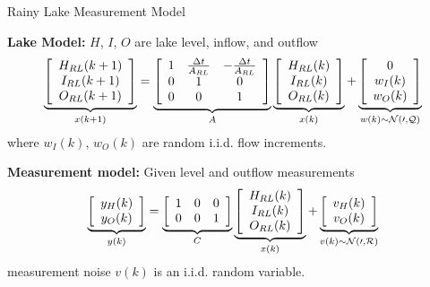 \documentclass[compress,english]{beamer}
\begin{document}
\begin{frame}{Rainy Lake Measurement Model}

{\bf Lake Model:} $H$, $I$, $O$ are lake level, inflow, and outflow
$$\underbrace{\left[\begin{array}{c} H_{RL}(k+1) \\ I_{RL}(k+1) \\ O_{RL}(k+1) \end{array}\right]}_{x(k+1)} = \underbrace{\left[ \begin{array}{ccc} 1 & \frac{\Delta t}{A_{RL}} & -\frac{\Delta t}{A_{RL}} \\0 & 1 & 0\\0 & 0 & 1\end{array}\right]}_{A} \underbrace{\left[\begin{array}{c} H_{RL}(k) \\ I_{RL}(k) \\ O_{RL}(k) \end{array}\right]}_{x(k)} + \underbrace{\left[ \begin{array}{c} 0 \\ w_{I}(k) \\ w_{O}(k)\end{array}\right]}_{w(k)\sim\cal{N}(0,Q)}$$
where $w_I(k)$, $w_O(k)$ are random i.i.d. flow increments.

{\bf Measurement model:} Given level and outflow measurements
$$\underbrace{\left[\begin{array}{c} y_H(k) \\ y_O(k) \end{array}\right]}_{y(k)} = \underbrace{\left[\begin{array}{ccc} 1 & 0 & 0 \\ 0 & 0 & 1 \end{array}\right]}_{C} \underbrace{\left[\begin{array}{c} H_{RL}(k) \\ I_{RL}(k) \\ O_{RL}(k) \end{array}\right]}_{x(k)} + \underbrace{\left[\begin{array}{c} v_{H}(k) \\ v_{O}(k) \end{array}\right]}_{v(k)\sim\cal{N}(0,R)} $$
measurement noise $v(k)$ is an i.i.d. random variable.

\end{frame}
\end{document}
